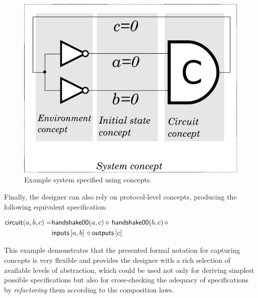 \documentclass[british,compsoc]{IEEEtran}
\begin{document}
\begin{figure}[t]
\begin{centering}
\includegraphics[scale=0.62]{Images/c-element-circuit-redo}
\par\end{centering}

\protect\caption{\label{fig:cElement-concepts}Example system specified using concepts.}
\end{figure}


Finally, the designer can also rely on protocol-level concepts, producing
the following equivalent specification:


\begin{minipage}[t]{1\columnwidth}%

$\\\begin{aligned}\mathsf{circuit}(a, b, c)=&\mathsf{handshake00}(a, c) \diamond\,\mathsf{handshake00}(b, c)\, \diamond\\
&\mathsf{inputs}\,[a,b] \,\diamond \mathsf{outputs}\,[c]
\end{aligned}$\\
\end{minipage}


This example demonstrates that the presented formal notation for capturing
concepts is very flexible and provides the designer with a rich selection
of available levels of abstraction, which could be used not only for
deriving simplest possible specifications but also for cross-checking
the adequacy of specifications by \emph{refactoring} them according
to the composition laws.
\end{document}
